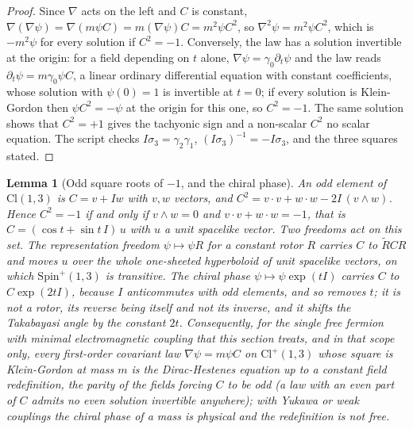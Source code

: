 \documentclass[11pt]{article}
\newtheorem{lemma}[theorem]{Lemma}
\theoremstyle{definition}
\newcommand{\Cl}{\mathrm{Cl}}
\begin{document}
\begin{proof}
Since $\nabla$ acts on the left and $C$ is constant, $\nabla(\nabla\psi) = \nabla(m\psi C) = m(\nabla\psi)C = m^{2}\psi C^{2}$, so $\nabla^{2}\psi = m^{2}\psi C^{2}$, which is $-m^{2}\psi$ for every solution if $C^{2} = -1$. Conversely, the law has a solution invertible at the origin: for a field depending on $t$ alone, $\nabla\psi = \gamma_{0}\partial_{t}\psi$ and the law reads $\partial_{t}\psi = m\gamma_{0}\psi C$, a linear ordinary differential equation with constant coefficients, whose solution with $\psi(0) = 1$ is invertible at $t = 0$; if every solution is Klein-Gordon then $\psi C^{2} = -\psi$ at the origin for this one, so $C^{2} = -1$. The same solution shows that $C^{2} = +1$ gives the tachyonic sign and a non-scalar $C^{2}$ no scalar equation. The script checks $I\sigma_{3} = \gamma_{2}\gamma_{1}$, $(I\sigma_{3})^{-1} = -I\sigma_{3}$, and the three squares stated.
\end{proof}

\begin{lemma}[Odd square roots of $-1$, and the chiral phase]\label{lem:oddroots}
An odd element of $\Cl(1,3)$ is $C = v + Iw$ with $v, w$ vectors, and $C^{2} = v \cdot v + w \cdot w - 2I\,(v \wedge w)$. Hence $C^{2} = -1$ if and only if $v \wedge w = 0$ and $v \cdot v + w \cdot w = -1$, that is $C = (\cos t + \sin t\, I)\,u$ with $u$ a unit spacelike vector. Two freedoms act on this set. The representation freedom $\psi \mapsto \psi R$ for a constant rotor $R$ carries $C$ to $\tilde{R}CR$ and moves $u$ over the whole one-sheeted hyperboloid of unit spacelike vectors, on which $\mathrm{Spin}^{+}(1,3)$ is transitive. The chiral phase $\psi \mapsto \psi\exp(tI)$ carries $C$ to $C\exp(2tI)$, because $I$ anticommutes with odd elements, and so removes $t$; it is not a rotor, its reverse being itself and not its inverse, and it shifts the Takabayasi angle by the constant $2t$. Consequently, for the single free fermion with minimal electromagnetic coupling that this section treats, and in that scope only, every first-order covariant law $\nabla\psi = m\psi C$ on $\Cl^{+}(1,3)$ whose square is Klein-Gordon at mass $m$ is the Dirac-Hestenes equation up to a constant field redefinition, the parity of the fields forcing $C$ to be odd (a law with an even part of $C$ admits no even solution invertible anywhere); with Yukawa or weak couplings the chiral phase of a mass is physical and the redefinition is not free.
\end{lemma}
\end{document}
